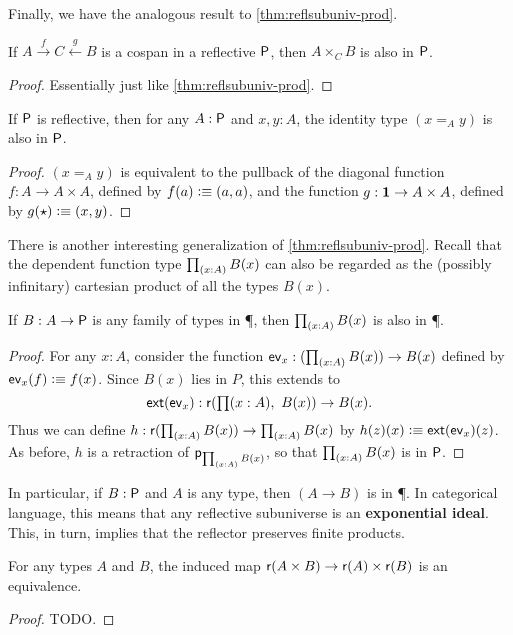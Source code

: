 Finally, we have the analogous result to \autoref{thm:reflsubuniv-prod}.

\begin{thm}\label{thm:reflsubuniv-pb}
  If $A \xrightarrow{f}  C \xleftarrow{g} B$ is a cospan in a reflective $\P$, then $A\times_C B$ is also in $\P$.
\end{thm}
\begin{proof}
  Essentially just like \autoref{thm:reflsubuniv-prod}.
\end{proof}

\begin{cor}\label{thm:reflsubuniv-idtype}
  If $\P$ is reflective, then for any $A:\P$ and $x,y:A$, the identity type $(x=_A y)$ is also in $\P$.
\end{cor}
\begin{proof}
  $(x=_A y)$ is equivalent to the pullback of the diagonal function $f:A\to A\times A$, defined by $f(a)\defeq (a,a)$, and the function
$g:\unit\to A\times A$, defined by $g(\ttt)\defeq (x,y)$.
\end{proof}

There is another interesting generalization of \autoref{thm:reflsubuniv-prod}.
Recall that the dependent function type $\prd{x:A} B(x)$ can also be regarded as the (possibly infinitary) cartesian product of all the
types $B(x)$.

\begin{thm}\label{thm:reflsubunv-forall}
  If $B:A\to\P$ is any family of types in \P, then $\prd{x:A} B(x)$ is also in \P.
\end{thm}
\begin{proof}
  For any $x:A$, consider the function $\mathsf{ev}_x : (\prd{x:A} B(x)) \to B(x)$ defined by $\mathsf{ev}_x(f) \defeq f(x)$.
  Since $B(x)$ lies in $P$, this extends to
  \[ \ext(\mathsf{ev}_x) : \reflect(\prd{x:A} B(x)) \to B(x). \]
  Thus we can define $h:\reflect(\prd{x:A} B(x)) \to \prd{x:A} B(x)$ by $h(z)(x) \defeq \ext(\mathsf{ev}_x)(z)$.
  As before, $h$ is a retraction of $\project_{\prd{x:A} B(x)}$, so that ${\prd{x:A} B(x)}$ is in $\P$.
\end{proof}

In particular, if $B:\P$ and $A$ is any type, then $(A\to B)$ is in \P.
In categorical language, this means that any reflective subuniverse is an \textbf{exponential ideal}.
This, in turn, implies that the reflector preserves finite products.

\begin{cor}
  For any types $A$ and $B$, the induced map $\reflect(A\times B) \to \reflect(A) \times \reflect(B)$ is an equivalence.
\end{cor}
\begin{proof}
  TODO.
\end{proof}

